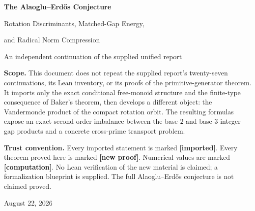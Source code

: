 \documentclass[11pt,oneside]{article}
\theoremstyle{definition}
\theoremstyle{remark}
\newcommand{\statusprior}{\textcolor{deepblue}{\textbf{[imported]}}}
\newcommand{\statusnew}{\textcolor{deepgreen}{\textbf{[new proof]}}}
\newcommand{\statuscomp}{\textcolor{amber}{\textbf{[computation]}}}
\begin{document}
\hypersetup{pageanchor=false}
\begin{titlepage}
\centering
\vspace*{1.3cm}
{\Huge\bfseries The Alaoglu--Erd\H{o}s Conjecture\par}
\vspace{0.35cm}
{\LARGE Rotation Discriminants, Matched-Gap Energy,\par}
{\LARGE and Radical Norm Compression\par}
\vspace{0.7cm}
{\large An independent continuation of the supplied unified report\par}
\vspace{1.0cm}
\begin{minipage}{0.88\textwidth}
\small
\textbf{Scope.}  This document does not repeat the supplied report's twenty-seven
continuations, its Lean inventory, or its proofs of the primitive-generator theorem.  It
imports only the exact conditional free-monoid structure and the finite-type consequence of
Baker's theorem, then develops a different object: the Vandermonde product of the compact
rotation orbit.  The resulting formulas expose an exact second-order imbalance between the
base-$2$ and base-$3$ integer gap products and a concrete cross-prime transport problem.

\textbf{Trust convention.}  Every imported statement is marked \statusprior.  Every theorem
proved here is marked \statusnew.  Numerical values are marked \statuscomp.  No Lean
verification of the new material is claimed; a formalization blueprint is supplied.  The
full Alaoglu--Erd\H{o}s conjecture is not claimed proved.
\end{minipage}
\vfill
{\large August 22, 2026\par}
\end{titlepage}
\hypersetup{pageanchor=true}

\end{document}

